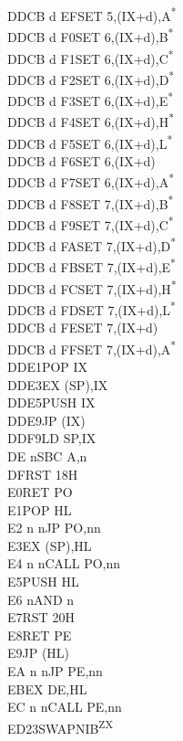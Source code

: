 \documentclass[oneside,a4paper]{book}
\begin{document}
\begin{multicols}{3}
{\begin{tabbing}
DDCB d EF\>SET 5,(IX+d),A\textsuperscript{*}\\
DDCB d F0\>SET 6,(IX+d),B\textsuperscript{*}\\
DDCB d F1\>SET 6,(IX+d),C\textsuperscript{*}\\
DDCB d F2\>SET 6,(IX+d),D\textsuperscript{*}\\
DDCB d F3\>SET 6,(IX+d),E\textsuperscript{*}\\
DDCB d F4\>SET 6,(IX+d),H\textsuperscript{*}\\
DDCB d F5\>SET 6,(IX+d),L\textsuperscript{*}\\
DDCB d F6\>SET 6,(IX+d)\\
DDCB d F7\>SET 6,(IX+d),A\textsuperscript{*}\\
DDCB d F8\>SET 7,(IX+d),B\textsuperscript{*}\\
DDCB d F9\>SET 7,(IX+d),C\textsuperscript{*}\\
DDCB d FA\>SET 7,(IX+d),D\textsuperscript{*}\\
DDCB d FB\>SET 7,(IX+d),E\textsuperscript{*}\\
DDCB d FC\>SET 7,(IX+d),H\textsuperscript{*}\\
DDCB d FD\>SET 7,(IX+d),L\textsuperscript{*}\\
DDCB d FE\>SET 7,(IX+d)\\
DDCB d FF\>SET 7,(IX+d),A\textsuperscript{*}\\
DDE1\>POP IX\\
DDE3\>EX (SP),IX\\
DDE5\>PUSH IX\\
DDE9\>JP (IX)\\
DDF9\>LD SP,IX\\
DE n\>SBC A,n\\
DF\>RST 18H\\
E0\>RET PO\\
E1\>POP HL\\
E2 n n\>JP PO,nn\\
E3\>EX (SP),HL\\
E4 n n\>CALL PO,nn\\
E5\>PUSH HL\\
E6 n\>AND n\\
E7\>RST 20H\\
E8\>RET PE\\
E9\>JP (HL)\\
EA n n\>JP PE,nn\\
EB\>EX DE,HL\\
EC n n\>CALL PE,nn\\
ED23\>SWAPNIB\textsuperscript{ZX}\\

\end{tabbing}}
\end{multicols}
\end{document}
